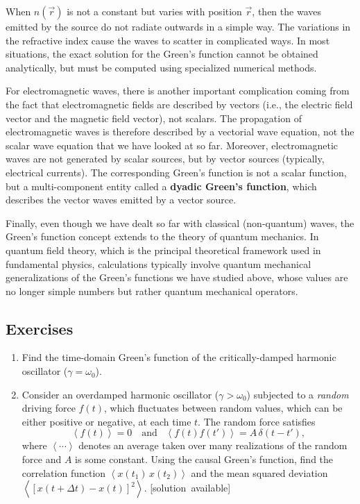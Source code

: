 \documentclass[10pt,a4paper]{article}
\begin{document}
When $n(\vec{r})$ is not a constant but varies with position
$\vec{r}$, then the waves emitted by the source do not radiate
outwards in a simple way. The variations in the refractive index cause
the waves to scatter in complicated ways. In most situations, the
exact solution for the Green's function cannot be obtained
analytically, but must be computed using specialized numerical
methods.

For electromagnetic waves, there is another important complication
coming from the fact that electromagnetic fields are described by
vectors (i.e., the electric field vector and the magnetic field vector),
not scalars. The propagation of electromagnetic waves is therefore
described by a vectorial wave equation, not the scalar wave equation
that we have looked at so far. Moreover, electromagnetic waves are not
generated by scalar sources, but by vector sources (typically,
electrical currents). The corresponding Green's function is not a scalar
function, but a multi-component entity called a \textbf{dyadic Green's
function}, which describes the vector waves emitted by a vector source.

Finally, even though we have dealt so far with classical (non-quantum)
waves, the Green's function concept extends to the theory of quantum
mechanics. In quantum field theory, which is the principal theoretical
framework used in fundamental physics, calculations typically involve
quantum mechanical generalizations of the Green's functions we have
studied above, whose values are no longer simple numbers but rather
quantum mechanical operators.

\subsection{Exercises}\label{exercises}

\begin{enumerate}
\item
  Find the time-domain Green's function of the critically-damped
  harmonic oscillator ($\gamma = \omega_0$).
\item
  Consider an overdamped harmonic oscillator ($\gamma > \omega_0$)
  subjected to a \emph{random} driving force $f(t)$, which fluctuates
  between random values, which can be either positive or negative, at
  each time $t$. The random force satisfies
  \begin{equation}
    \left\langle f(t)\right\rangle = 0 \quad\mathrm{and}\;\;\;\left\langle f(t) f(t')\right\rangle = A \, \delta(t-t'),
  \end{equation}
  where $\left\langle\cdots\right\rangle$ denotes an average taken
  over many realizations of the random force and $A$ is some constant.
  Using the causal Green's function, find the correlation function
  $\left\langle x(t_1)\, x(t_2) \right\rangle$ and the mean squared
  deviation $\left\langle [x(t+\Delta t) - x(t)]^2 \right\rangle.$
  \vskip -0.05in
  \hfill{\scriptsize [solution~available]}
\end{enumerate}
\end{document}
